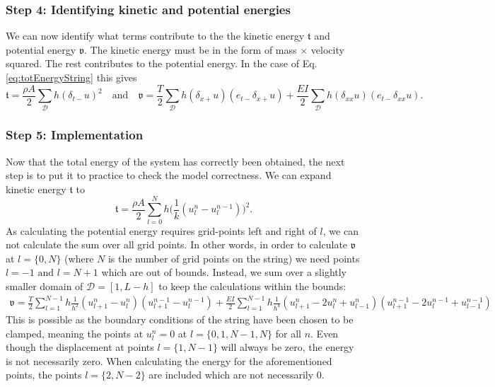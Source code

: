 \documentclass{article}
\begin{document}
\subsubsection*{Step 4: Identifying kinetic and potential energies}
We can now identify what terms contribute to the the kinetic energy $\mathfrak{t}$ and potential energy $\mathfrak{v}$. The kinetic energy must be in the form of mass $\times$ velocity squared. The rest contributes to the potential energy. %
In the case of Eq. \eqref{eq:totEnergyString} this gives
\begin{equation}
    \mathfrak{t} = \frac{\rho A}{2}\sum_\mathcal{D}h(\delta_{t-}u)^2 \quad \text{and} \quad \mathfrak{v} = \frac{T}{2}\sum_\mathcal{D}h (\delta_{x+}u)( e_{t-}\delta_{x+}u) +\frac{EI}{2}\sum_\mathcal{D}h(\delta_{xx}u)(e_{t-}\delta_{xx}u).
\end{equation}

\subsubsection*{Step 5: Implementation}
Now that the total energy of the system has correctly been obtained, the next step is to put it to practice to check the model correctness. We can expand kinetic energy $\mathfrak{t}$ to
\begin{equation}
    \mathfrak{t} = \frac{\rho A}{2}\sum_{l=0}^Nh\bigg(\frac{1}{k}(u_l^n - u_l^{n-1})\bigg)^2.
\end{equation}
As calculating the potential energy requires grid-points left and right of $l$, we can not calculate the sum over all grid points. In other words, in order to calculate $\mathfrak{v}$ at $l = \{0, N\}$ (where $N$ is the number of grid points on the string) we need points $l = -1 \text{ and } l = N + 1$ which are out of bounds. Instead, we sum over a slightly smaller domain of $\mathcal{D} = [1, L - h]$ to keep the calculations within the bounds:
\begin{equation}
\begin{aligned}
   \mathfrak{v} = \frac{T}{2}\sum_{l = 1}^{N-1} h\frac{1}{h^2}(u_{l+1}^n - u_l^n)(u_{l+1}^{n-1} - u_l^{n-1})
   + \frac{EI}{2}\sum_{l = 1}^{N-1}h\frac{1}{h^4}(u_{l+1}^n-2u_l^n+u_{l-1}^n)(u_{l+1}^{n-1}-2u_l^{n-1}+u_{l-1}^{n-1})
\end{aligned}
\end{equation}
This is possible as the boundary conditions of the string have been chosen to be clamped, meaning the points at $u_l^n = 0$ at $l = \{0, 1, N-1, N\}$ for all $n$. Even though the displacement at points $l = \{1, N-1\}$ will always be zero, the energy is not necessarily zero. When calculating the energy for the aforementioned points, the points $l = \{2, N-2\}$ are included which are not necessarily $0$.
\end{document}
